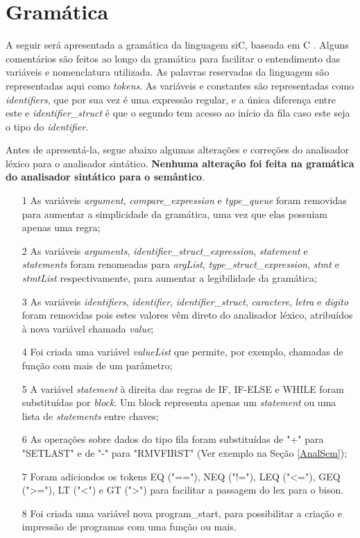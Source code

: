 \documentclass[12pt]{article}
\begin{document}
\section{Gramática}

\indent A seguir será apresentada a gramática da linguagem siC, baseada em C \cite{yacc}. Alguns comentários são feitos ao longo da gramática para facilitar o entendimento das variáveis e nomenclatura utilizada. As palavras reservadas da linguagem são representadas aqui como \textit{tokens}. As variáveis e constantes são representadas como \textit{identifiers}, que por sua vez é uma expressão regular, e a única diferença entre este e \textit{identifier\_struct} é que o segundo tem acesso ao início da fila caso este seja o tipo do \textit{identifier}. 

\indent Antes de apresentá-la, segue abaixo algumas alterações e correções do analisador léxico para o analisador sintático. \textbf{Nenhuma alteração foi feita na gramática do analisador sintático para o semântico}.

\begin{itemize}
	\item[1] As variáveis \textit{argument}, \textit{compare\_expression} e \textit{type\_queue} foram removidas para aumentar a simplicidade da gramática, uma vez que elas possuiam apenas uma regra;
	\item[2] As variáveis \textit{arguments}, \textit{identifier\_struct\_expression}, \textit{statement} e \textit{statements} foram renomeadas para \textit{argList}, \textit{type\_struct\_expression}, \textit{stmt} e \textit{stmtList} respectivamente, para aumentar a legibilidade da gramática;
	\item[3] As variáveis \textit{identifiers}, \textit{identifier}, \textit{identifier\_struct}, \textit{caractere}, \textit{letra} e \textit{digito} foram removidas pois estes valores vêm direto do analisador léxico, atribuídos à nova variável chamada \textit{value};
	\item[4] Foi criada uma variável \textit{valueList} que permite, por exemplo, chamadas de função com mais de um parâmetro;
	\item[5] A variável \textit{statement} à direita das regras de IF, IF-ELSE e WHILE foram substituídas por \textit{block}. Um block representa apenas um \textit{statement} ou uma lista de \textit{statements} entre chaves;
	\item[6] As operações sobre dados do tipo fila foram substituídas de "+" para "SETLAST" e de "-" para "RMVFIRST" (Ver exemplo na Seção \ref{AnalSem});
	\item[7] Foram adiciondos os tokens EQ ("=="), NEQ ("!="), LEQ ("<="), GEQ (">="), LT ("<") e GT (">") para facilitar a passagem do lex para o bison.
	\item[8] Foi criada uma variável nova program\_start, para possibilitar a criação e impressão de programas com uma função ou mais.
\end{itemize}
\end{document}

